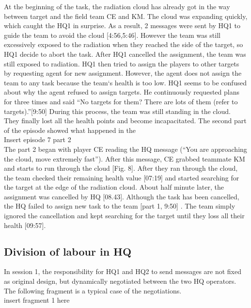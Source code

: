 At the beginning of the task, the radiation cloud has already got in the way between target and the field team CE and KM. The cloud was expanding quickly, which caught the HQ1 in surprise. As a result, 2 messages were sent by HQ1 to guide the team to avoid the cloud [4:56,5:46]. However the team was still excessively exposed to the radiation when they reached the side of the target, so HQ1 decide to abort the task. After HQ1 cancelled the assignment, the team was still exposed to radiation. HQ1 then tried to assign the players to other targets by requesting agent for new assignment. However, the agent does not assign the team to any task because the team`s health is too low. HQ1 seems to be confused about why the agent refused to assign targets. He continuously requested plans for three times and said ``No targets for them? There are lots of them (refer to targets).''[9:50] During this process, the team was still standing in the cloud. They finally lost all the health points and become incapacitated. The second part of the episode showed what happened in the \\

Insert episode 7 part 2\\

The part 2 began with player CE reading the HQ message (``You are approaching the cloud, move extremely fast''). After this message, CE grabbed teammate KM and starts to run through the cloud [Fig. 8].  After they ran through the cloud, the team checked their remaining health value [07:19] and started searching for the target at the edge of the radiation cloud. About half minute later, the assignment was cancelled by HQ [08.43]. Although the task has been cancelled, the HQ failed to assign new task to the team [part 1, 9:50] . The team simply ignored the cancellation and kept searching for the target until they loss all their health [09:57]. \\

\subsection{Division of labour in HQ}

In session 1, the responsibility for HQ1 and HQ2 to send messages are not fixed as original design, but dynamically negotiated between the two HQ operators. The following fragment is a typical case of the negotiations.\\

insert fragment 1 here\\

